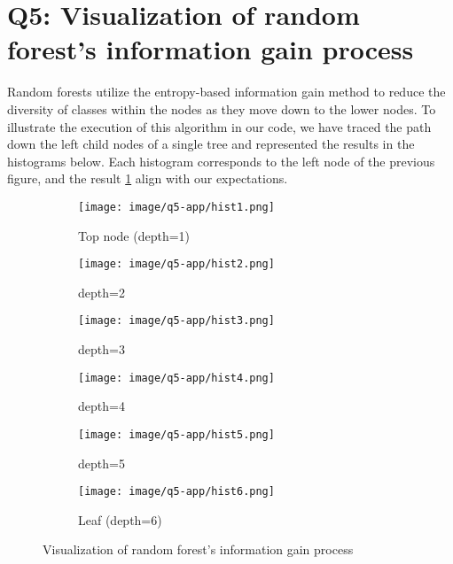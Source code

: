 \section{Q5: Visualization of random forest's information gain process}
\label{subsec:Q5-2}
Random forests utilize the entropy-based information gain method to reduce the diversity of classes within the nodes as they move down to the lower nodes. To illustrate the execution of this algorithm in our code, we have traced the path down the left child nodes of a single tree and represented the results in the histograms below. Each histogram corresponds to the left node of the previous figure, and the result \cref{fig:app-q5-1} align with our expectations.

\begin{figure}
	\centering
	\begin{subfigure}{0.33\linewidth}
		\centering
		\texttt{[image: image/q5-app/hist1.png]}
		\caption{Top node (depth=1)}
	\end{subfigure}%
	\hfill
	\begin{subfigure}{0.33\linewidth}
		\centering
		\texttt{[image: image/q5-app/hist2.png]}
		\caption{depth=2}
	\end{subfigure}
	\hfill
	\begin{subfigure}{0.33\linewidth}
		\centering
		\texttt{[image: image/q5-app/hist3.png]}
		\caption{depth=3}
	\end{subfigure}
	
	\begin{subfigure}{0.33\linewidth}
		\centering
		\texttt{[image: image/q5-app/hist4.png]}
		\caption{depth=4}
	\end{subfigure}%
	\hfill
	\begin{subfigure}{0.33\linewidth}
		\centering
		\texttt{[image: image/q5-app/hist5.png]}
		\caption{depth=5}
	\end{subfigure}
	\hfill
	\begin{subfigure}{0.33\linewidth}
		\centering
		\texttt{[image: image/q5-app/hist6.png]}
		\caption{Leaf (depth=6)}
	\end{subfigure}
	\caption{Visualization of random forest's information gain process}
	\label{fig:app-q5-1}
\end{figure}